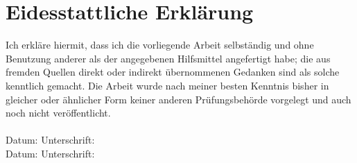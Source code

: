 \chapter*{Eidesstattliche Erklärung}
\label{erklaerung}
Ich erkläre hiermit, dass ich die vorliegende Arbeit selbständig und ohne Benutzung anderer als der angegebenen Hilfsmittel angefertigt habe; die aus fremden Quellen direkt oder indirekt übernommenen Gedanken sind als solche kenntlich gemacht. 
Die Arbeit wurde nach meiner besten Kenntnis bisher in gleicher oder ähnlicher Form keiner anderen Prüfungsbehörde vorgelegt und auch noch nicht veröffentlicht.  \\
\\[1.5cm]
Datum:	\hrulefill\enspace Unterschrift: \hrulefill
\\[1.5cm]
Datum:	\hrulefill\enspace Unterschrift: \hrulefill
{}